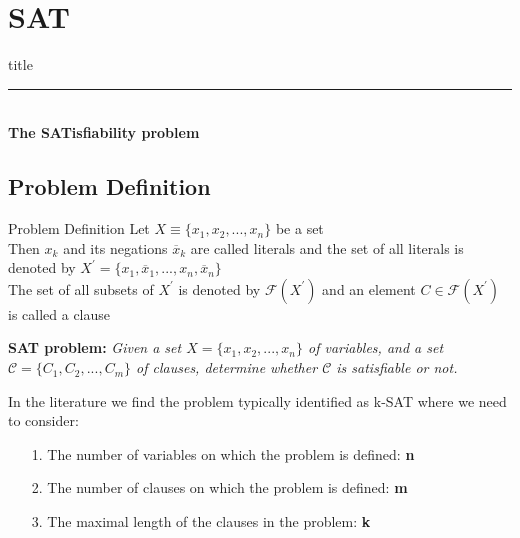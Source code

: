 \section{SAT}

	\begin{frame}[plain]
		\vfill
		\centering
		\begin{beamercolorbox}[sep=8pt,center,shadow=true,rounded=true]{title}
			\textbf{\insertsectionhead}\par%
			\color{polimiblue}\noindent\rule{10cm}{1pt} \\
			\textbf{The SATisfiability problem}
		\end{beamercolorbox}
		\vfill
	\end{frame}

	\subsection{Problem Definition}
		\begin{frame}{Problem Definition}
			\small
			 Let $X\equiv\{x_1, x_2, ..., x_n\}$ be a set\\
			 \vspace{0.1cm}
			 Then $x_k$ and its negations $\overline{x}_k$ are called literals and the set of all literals is denoted by $X^{'}=\{x_1, \overline{x}_1, ..., x_n, \overline{x}_n\}$\\
			 \vspace{0.1cm}
			 The set of all subsets of $X^{'}$ is denoted by $\mathcal{F}(X^{'})$ and an element $C\in\mathcal{F}(X^{'})$ is called a clause\\
			 
			 \vspace{0.3cm}
			 
			 \textbf{SAT problem:} \emph{Given a set $X=\{x_1, x_2, ..., x_n\}$ of variables, and a set $\mathcal{C}=\{C_1, C_2, ..., C_m\}$ of clauses, determine whether $\mathcal{C}$ is satisfiable or not.\\}
			 
			 \vspace{0.3cm}
			 
			 In the literature we find the problem typically identified as k-SAT where we need to consider:
			 \begin{itemize}
			 	\item[1.] The number of variables on which the problem is defined: \textbf{n}
			 	
			 	\item[2.] The number of clauses on which the problem is defined: \textbf{m}
			 	
			 	\item[3.] The maximal length of the clauses in the problem: \textbf{k}
			 \end{itemize}
		\end{frame}
	
